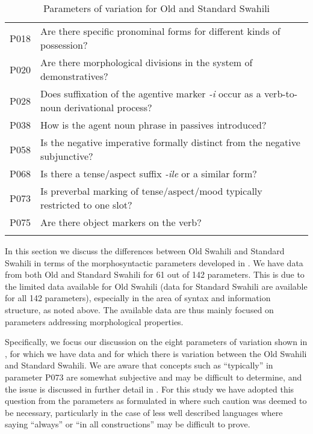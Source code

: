 \documentclass[output=paper]{langscibook}
\begin{document}
\begin{table}[b]
\begin{tabularx}{\textwidth}{lQ}
\lsptoprule
P018 & Are there specific pronominal forms for different kinds of possession?\\
P020 & Are there morphological divisions in the system of demonstratives?\\
P028 & Does suffixation of the agentive marker \textit{{}-i} occur as a verb-to-noun derivational process?\\
P038 & How is the agent noun phrase in passives introduced?\\
P058 & Is the negative imperative formally distinct from the negative subjunctive?\\
P068 & Is there a tense/aspect suffix \textit{{}-ile} or a similar form?\\
P073 & Is preverbal marking of tense/aspect/mood typically restricted to one slot?\\
P075 & Are there object markers on the verb?\\
\lspbottomrule
\end{tabularx}
\caption{\label{tab:marten:2} Parameters of variation for Old and Standard Swahili}
\end{table}


In this section we discuss the differences between Old Swahili and Standard Swahili in terms of the morphosyntactic parameters developed in \citet{GuéroisEtAl2017}. We have data from both Old and Standard Swahili for 61 out of 142 parameters. This is due to the limited data available for Old Swahili (data for Standard Swahili are available for all 142 parameters), especially in the area of syntax and information structure, as noted above. The available data are thus mainly focused on parameters addressing morphological properties. 

Specifically, we focus our discussion on the eight parameters of variation shown in , for which we have data and for which there is variation between the Old Swahili and Standard Swahili. We are aware that concepts such as ``typically'' in parameter P073 are somewhat subjective and may be difficult to determine, and the issue is discussed in further detail in . For this study we have adopted this question from the parameters as formulated in \citet{GuéroisEtAl2017} where such caution was deemed to be necessary, particularly in the case of less well described languages where saying ``always'' or ``in all constructions'' may be difficult to prove.
\end{document}
